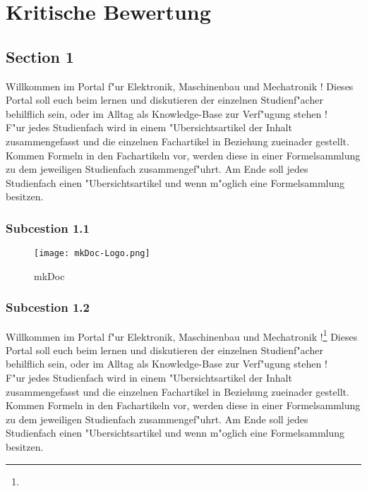 \chapter{Kritische Bewertung}
\label{cha:Fazit}

\section{Section 1}
\label{sec:6Section1}
Willkommen im Portal f"ur Elektronik, Maschinenbau und Mechatronik !
Dieses Portal soll euch beim lernen und diskutieren der einzelnen Studienf"acher behilflich sein, oder im Alltag als Knowledge-Base zur Verf"ugung stehen ! \\
F"ur jedes Studienfach wird in einem "Ubersichtsartikel der Inhalt zusammengefasst und die einzelnen Fachartikel in Beziehung zueinader gestellt. Kommen Formeln in den Fachartikeln vor, werden diese in einer Formelsammlung zu dem jeweiligen Studienfach zusammengef"uhrt. Am Ende soll jedes Studienfach einen "Ubersichtsartikel und wenn m"oglich eine Formelsammlung besitzen.

\subsection{Subcestion 1.1}
\label{subsec:6Subcestion1.1}

\begin{figure}[htb]
\centering
\texttt{[image: mkDoc-Logo.png]}
\caption{mkDoc}
\label{fig:mkDoc}
\end{figure}


\subsection{Subcestion 1.2}
\label{subsec:6Subcestion 1.2}
Willkommen im Portal f"ur Elektronik, Maschinenbau und Mechatronik !\footnote{\Vgl{}}
Dieses Portal soll euch beim lernen und diskutieren der einzelnen Studienf"acher behilflich sein, oder im Alltag als Knowledge-Base zur Verf"ugung stehen ! \\
F"ur jedes Studienfach wird in einem "Ubersichtsartikel der Inhalt zusammengefasst und die einzelnen Fachartikel in Beziehung zueinader gestellt. Kommen Formeln in den Fachartikeln vor, werden diese in einer Formelsammlung zu dem jeweiligen Studienfach zusammengef"uhrt. Am Ende soll jedes Studienfach einen "Ubersichtsartikel und wenn m"oglich eine Formelsammlung besitzen.


